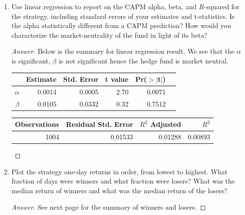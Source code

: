 \documentclass[10pt]{article}
\begin{document}
\begin{enumerate}
\begin{enumerate}
        \item Use linear regression to report on the CAPM alpha, beta, and $R$-squared for the strategy, including standard errors of your estimates and t-statistics. Is the alpha statistically different from a CAPM prediction? How would you characterize the market-neutrality of the fund in light of its beta?
        \begin{proof}[Answer] Below is the summary for linear regression result. We see that the $\alpha$ is significant, $\beta$ is not significant hence the hedge fund is market neutral. 
        \begin{table}[ht]
\centering
\begin{tabular}{rrrrrr}
  \hline
 & Estimate & Std. Error & t value & Pr($>$$|$t$|$)\\ 
  \hline
$\alpha$ & 0.0014 & 0.0005 & 2.70 & 0.0071 \\ 
  $\beta$ & 0.0105 & 0.0332 & 0.32 & 0.7512 \\
   \hline
\end{tabular}

\medskip
\begin{tabular}{rrrr}
    \hline
     Observations  & Residual Std. Error  &  $R^2$     Adjusted & $R^2$ \\
     \hline
    1004        &     0.01533    &     0.01288      &0.00893      \\
     \hline
\end{tabular}
\end{table} 
 

        
    
        \end{proof}        
        
        
        \item Plot the strategy one-day returns in order, from lowest to highest. What fraction of days were winners and what fraction were losers? What was the median return of winners and what was the median return of the losers?
        \begin{proof}[Answer] See next page for the summary of winners and losers.
        

\end{proof}
\end{enumerate}
\end{enumerate}
\end{document}
